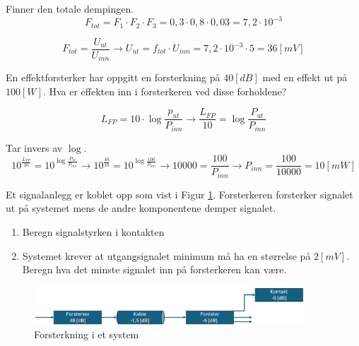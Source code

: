 \vspace{0.5cm} %

\begin{solution}[name=Løsningsforslag oppgave]
Finner den totale dempingen.
\[F_{tot}= F_1 \cdot F_2 \cdot F_3 = 0,3 \cdot 0,8 \cdot 0,03 = 7,2 \cdot 10^{-3}\]

\[F_{tot}=\frac{U_{ut}}{U_{inn}} \rightarrow U_{ut}=f_{tot} \cdot U_{inn}=7,2 \cdot 10^{-3} \cdot 5 = 36[mV]\]

\end{solution}


\vspace{0.5cm} %


\begin{question}[name=Oppgave, topic=forsterkning]
En effektforsterker har oppgitt en forsterkning på $40 [dB]$ med en effekt ut på $100[W]$. Hva er effekten inn i forsterkeren ved disse forholdene?
\end{question}

\vspace{0.5cm} %

\begin{solution}[name=Løsningsforslag oppgave]
\[L_{FP}=10 \cdot \log \frac{p_{ut}}{P_{inn}} \rightarrow \frac{L_{FP}}{10}=\log \frac{P_{ut}}{P_{inn}}\]

Tar invers av $\log$.
\[10^{\frac{L_{FP}}{ 10}}= 10^{\log \frac{P_{ut}}{P_{inn}}} \rightarrow 10^{\frac{40}{10}}=10^{\log \frac{100}{P_{inn}}} \rightarrow 10000= \frac{100}{P_{inn}} \rightarrow P_{inn}=\frac{100}{10000}=10[mW]\]

\end{solution}


\vspace{0.5cm} %




\begin{question}[name=Oppgave, topic=forsterkning]
Et signalanlegg er koblet opp som vist i Figur \ref{fig:forsterk5}. Forsterkeren forsterker signalet ut på systemet mens de andre komponentene demper signalet.
	\begin{enumerate}[label=\roman*)]
	\item Beregn signalstyrken i kontakten
	\item Systemet krever at utgangsignalet minimum må ha en størrelse på $2[mV]$. Beregn hva det minste signalet inn på forsterkeren kan være.
	\end{enumerate}

	\begin{figure}[H]
	\centering
	\includegraphics[width=0.9\textwidth]{forsterkning/figurer/forsterkning4.png}
	\caption{Forsterkning i et system}
	\label{fig:forsterk5}
\end{figure}

\end{question}

